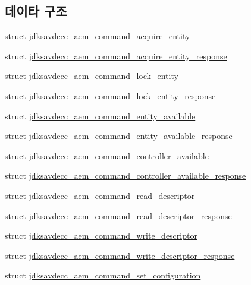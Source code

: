 \subsection*{데이타 구조}
\begin{DoxyCompactItemize}
\item 
struct \hyperlink{structjdksavdecc__aem__command__acquire__entity}{jdksavdecc\+\_\+aem\+\_\+command\+\_\+acquire\+\_\+entity}
\item 
struct \hyperlink{structjdksavdecc__aem__command__acquire__entity__response}{jdksavdecc\+\_\+aem\+\_\+command\+\_\+acquire\+\_\+entity\+\_\+response}
\item 
struct \hyperlink{structjdksavdecc__aem__command__lock__entity}{jdksavdecc\+\_\+aem\+\_\+command\+\_\+lock\+\_\+entity}
\item 
struct \hyperlink{structjdksavdecc__aem__command__lock__entity__response}{jdksavdecc\+\_\+aem\+\_\+command\+\_\+lock\+\_\+entity\+\_\+response}
\item 
struct \hyperlink{structjdksavdecc__aem__command__entity__available}{jdksavdecc\+\_\+aem\+\_\+command\+\_\+entity\+\_\+available}
\item 
struct \hyperlink{structjdksavdecc__aem__command__entity__available__response}{jdksavdecc\+\_\+aem\+\_\+command\+\_\+entity\+\_\+available\+\_\+response}
\item 
struct \hyperlink{structjdksavdecc__aem__command__controller__available}{jdksavdecc\+\_\+aem\+\_\+command\+\_\+controller\+\_\+available}
\item 
struct \hyperlink{structjdksavdecc__aem__command__controller__available__response}{jdksavdecc\+\_\+aem\+\_\+command\+\_\+controller\+\_\+available\+\_\+response}
\item 
struct \hyperlink{structjdksavdecc__aem__command__read__descriptor}{jdksavdecc\+\_\+aem\+\_\+command\+\_\+read\+\_\+descriptor}
\item 
struct \hyperlink{structjdksavdecc__aem__command__read__descriptor__response}{jdksavdecc\+\_\+aem\+\_\+command\+\_\+read\+\_\+descriptor\+\_\+response}
\item 
struct \hyperlink{structjdksavdecc__aem__command__write__descriptor}{jdksavdecc\+\_\+aem\+\_\+command\+\_\+write\+\_\+descriptor}
\item 
struct \hyperlink{structjdksavdecc__aem__command__write__descriptor__response}{jdksavdecc\+\_\+aem\+\_\+command\+\_\+write\+\_\+descriptor\+\_\+response}
\item 
struct \hyperlink{structjdksavdecc__aem__command__set__configuration}{jdksavdecc\+\_\+aem\+\_\+command\+\_\+set\+\_\+configuration}

\end{DoxyCompactItemize}
